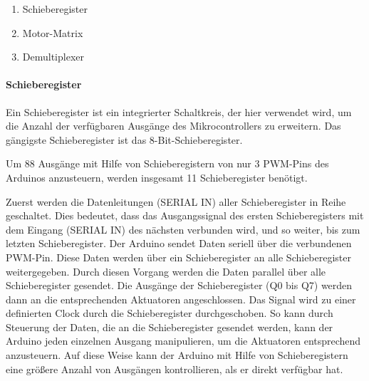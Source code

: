 \begin{enumerate}
	\item Schieberegister
	\item Motor-Matrix
	\item Demultiplexer
\end{enumerate}

 \paragraph{Schieberegister}
Ein Schieberegister ist ein integrierter Schaltkreis, der hier verwendet wird, um die Anzahl der verfügbaren Ausgänge des
Mikrocontrollers zu erweitern. Das gängigste Schieberegister ist das 8-Bit-Schieberegister. \newline

Um 88 Ausgänge mit Hilfe von Schieberegistern von nur 3 PWM-Pins des Arduinos anzusteuern, werden insgesamt 11
Schieberegister benötigt.\newline

Zuerst werden die Datenleitungen (SERIAL IN) aller Schieberegister in Reihe geschaltet. Dies bedeutet, dass das
Ausgangssignal des ersten Schieberegisters mit dem Eingang (SERIAL IN) des nächsten verbunden wird, und so weiter, bis
zum letzten Schieberegister. \newline
Der Arduino sendet Daten seriell über die verbundenen PWM-Pin. Diese Daten werden über ein Schieberegister an
alle Schieberegister weitergegeben. Durch diesen Vorgang werden die Daten parallel über alle Schieberegister gesendet.
\newline
Die Ausgänge der Schieberegister (Q0 bis Q7) werden dann an die entsprechenden Aktuatoren angeschlossen.
Das Signal wird zu einer definierten Clock durch die Schieberegister durchgeschoben. So kann durch Steuerung der Daten,
die an die Schieberegister gesendet werden, kann der Arduino jeden einzelnen Ausgang manipulieren, um die Aktuatoren
entsprechend anzusteuern. \newline
Auf diese Weise kann der Arduino mit Hilfe von Schieberegistern eine größere Anzahl von Ausgängen kontrollieren, als er
direkt verfügbar hat.


